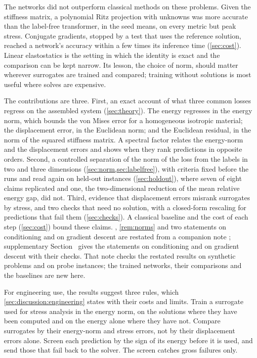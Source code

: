 The networks did not outperform classical methods on these problems. Given the stiffness matrix, a
polynomial Ritz projection with \numRitzThreeKMax{} unknowns was more accurate than the
label-free transformer, in the seed means, on every metric but peak stress. Conjugate
gradients, stopped by a test that uses the reference solution, reached a network's accuracy within a
few times its inference time (\cref{sec:cost}). Linear
elastostatics is the setting in which the identity
is exact and the comparison can be kept narrow. Its lesson, the choice of norm, should
matter wherever surrogates are trained and compared; training without solutions is most useful
where solves are expensive.

The contributions are three. First, an exact account of what three common losses regress on the assembled system
(\cref{sec:theory}). The energy regresses in the energy norm, which bounds the von Mises error
for a homogeneous isotropic material; the displacement error, in the Euclidean norm; and the
Euclidean residual, in the norm of the squared stiffness matrix. A
spectral factor relates the energy-norm and the displacement errors and shows when they rank
predictions in opposite orders. Second, a controlled separation of the norm of the loss from
the labels in two and three dimensions (\cref{sec:norm,sec:labelfree}), with criteria fixed
before the runs and read again on held-out instances (\cref{sec:holdout}), where seven of
eight claims replicated and one, the two-dimensional reduction of the mean relative energy
gap, did not. Third, evidence that displacement errors misrank surrogates by stress, and two checks
that need no solution, with a closed-form rescaling for predictions that fail them
(\cref{sec:checks}). A classical baseline and the cost of each step (\cref{sec:cost}) bound
these claims. , \cref{rem:norms} and two statements on conditioning and
on gradient descent are restated from a companion note \cite{CaoSong2026}; supplementary
Section~\SuppRepro{} gives the statements on conditioning and on gradient descent with their
checks. That note checks the restated results on synthetic
problems and on probe instances; the trained networks, their comparisons and the baselines are
new here.

For engineering use, the results suggest three rules, which \cref{sec:discussion:engineering}
states with their costs and limits. Train a surrogate used for stress analysis in the energy
norm, on the solutions where they have been computed and on the energy alone where they have
not. Compare surrogates by their energy-norm and stress errors, not by their displacement
errors alone. Screen each prediction by the sign of its energy before it is used, and send
those that fail back to the solver. The screen catches gross failures only.
